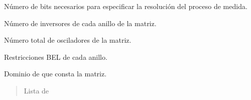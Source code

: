 \documentclass[letterpaper,10pt,english]{sphinxmanual}
\begin{document}
\begin{fulllineitems}

\begin{fulllineitems}
\label{\detokenize{fpga.ring_osc:fpga.ring_osc.StdMatrix.N_bits_resol}}
\pysigstartsignatures
{}
\pysigstopsignatures
\sphinxAtStartPar
Número de bits necesarios para especificar la resolución del proceso de medida.

\end{fulllineitems}


\begin{fulllineitems}
\label{\detokenize{fpga.ring_osc:fpga.ring_osc.StdMatrix.N_inv}}
\pysigstartsignatures
{}
\pysigstopsignatures
\sphinxAtStartPar
Número de inversores de cada anillo de la matriz.

\end{fulllineitems}


\begin{fulllineitems}
\label{\detokenize{fpga.ring_osc:fpga.ring_osc.StdMatrix.N_osc}}
\pysigstartsignatures
{}
\pysigstopsignatures
\sphinxAtStartPar
Número total de osciladores de la matriz.

\end{fulllineitems}


\begin{fulllineitems}
\label{\detokenize{fpga.ring_osc:fpga.ring_osc.StdMatrix.bel}}
\pysigstartsignatures
{}
\pysigstopsignatures
\sphinxAtStartPar
Restricciones BEL de cada anillo.

\end{fulllineitems}


\begin{fulllineitems}
\label{\detokenize{fpga.ring_osc:fpga.ring_osc.StdMatrix.dominios}}
\pysigstartsignatures
{}
\pysigstopsignatures
\sphinxAtStartPar
Dominio de que consta la matriz.
\begin{quote}\begin{description}
\sphinxAtStartPar
Lista de


\end{description}
\end{quote}
\end{fulllineitems}
\end{fulllineitems}
\end{document}
